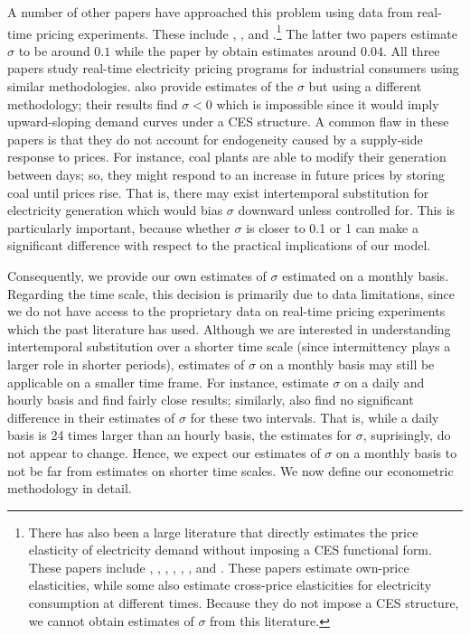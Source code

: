 \documentclass[11pt,a4paper]{extarticle}
\begin{document}
A number of other papers have approached this problem using data from real-time pricing experiments. These include \citet{Schwarz}, \citet{Herriges}, and \citet{KS1994}.\footnote{There has also been a large literature that directly estimates the price elasticity of electricity demand without imposing a CES functional form. These papers include \citet{Wolak}, \citet{Zarnikau}, \citet{Woo}, \citet{Zhou}, \citet{Reiss}, \citet{Fan}, and \citet{Deryugina}. These papers estimate own-price elasticities, while some also estimate cross-price elasticities for electricity consumption at different times. Because they do not impose a CES structure, we cannot obtain estimates of $\sigma$ from this literature. }
The latter two papers estimate $\sigma$ to be around $0.1$ while the paper by \citeauthor{Schwarz}  obtain estimates around $0.04$. All three papers study real-time electricity pricing programs for industrial consumers using similar methodologies. \citet{Aubin} also provide estimates of the $\sigma$ but using a different methodology; their results find $\sigma < 0$ which is impossible since it would imply upward-sloping demand curves under a CES structure. A common flaw in these papers is that they do not account for endogeneity caused by a supply-side response to prices. For instance, coal plants are able to modify their generation between days; so, they might respond to an increase in future prices by storing coal until prices rise. That is, there may exist intertemporal substitution for electricity generation which would bias $\sigma$ downward unless controlled for. This is particularly important, because whether $\sigma$ is closer to 0.1 or 1 can make a significant difference with respect to the practical implications of our model.

Consequently, we provide our own estimates of $\sigma$ estimated on a monthly basis. Regarding the time scale, this decision is primarily due to data limitations, since we do  not have access to the proprietary data on real-time pricing experiments which the past literature has used. Although we are interested in understanding intertemporal substitution over a shorter time scale (since intermittency plays a larger role in shorter periods), estimates of $\sigma$ on a monthly basis may still be applicable on a smaller time frame. For instance, \citet{Schwarz} estimate $\sigma$ on a daily and hourly basis and find fairly close results; similarly, \citet{Herriges} also find no significant difference in their estimates of $\sigma$ for these two intervals. That is, while a daily basis is 24 times larger than an hourly basis, the estimates for $\sigma$, suprisingly, do not appear to change. Hence, we expect our estimates of $\sigma$ on a monthly basis to not be far from estimates on shorter time scales. We now define our econometric methodology in detail.
\end{document}

